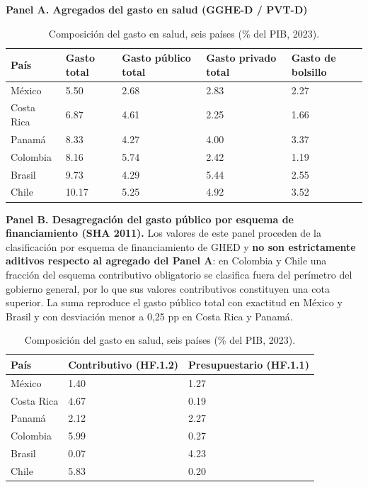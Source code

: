 \documentclass[12pt, letterpaper]{article}
\begin{document}
\begin{table}[h!]
\centering
\caption{Composición del gasto en salud, seis países (\% del PIB, 2023).}
\label{tab:salud}
\footnotesize

\textbf{Panel A. Agregados del gasto en salud (GGHE-D / PVT-D)}

\smallskip
\begin{tabular}{p{1.8cm}p{1.9cm}p{2.2cm}p{2.2cm}p{1.9cm}}
\toprule
País & Gasto total & Gasto público total & Gasto privado total & Gasto de bolsillo \\
\midrule
México      & 5.50  & 2.68 & 2.83 & 2.27 \\
Costa Rica  & 6.87  & 4.61 & 2.25 & 1.66 \\
Panamá      & 8.33  & 4.27 & 4.00 & 3.37 \\
Colombia    & 8.16  & 5.74 & 2.42 & 1.19 \\
Brasil      & 9.73  & 4.29 & 5.44 & 2.55 \\
Chile       & 10.17 & 5.25 & 4.92 & 3.52 \\
\bottomrule
\end{tabular}

\medskip
\begin{minipage}{0.95\textwidth}
\textbf{Panel B. Desagregación del gasto público por esquema de financiamiento
(SHA 2011).} Los valores de este panel proceden de la clasificación por esquema de
financiamiento de GHED y \textbf{no son estrictamente aditivos respecto al agregado
del Panel A}: en Colombia y Chile una fracción del esquema contributivo obligatorio
se clasifica fuera del perímetro del gobierno general, por lo que sus valores
contributivos constituyen una cota superior. La suma reproduce el gasto público
total con exactitud en México y Brasil y con desviación menor a 0{,}25 pp en Costa
Rica y Panamá.
\end{minipage}

\smallskip
\begin{tabular}{p{1.8cm}p{3.2cm}p{3.4cm}}
\toprule
País & Contributivo (HF.1.2) & Presupuestario (HF.1.1) \\
\midrule
México      & 1.40 & 1.27 \\
Costa Rica  & 4.67 & 0.19 \\
Panamá      & 2.12 & 2.27 \\
Colombia    & 5.99 & 0.27 \\
Brasil      & 0.07 & 4.23 \\
Chile       & 5.83 & 0.20 \\
\bottomrule
\end{tabular}


\end{table}
\end{document}
